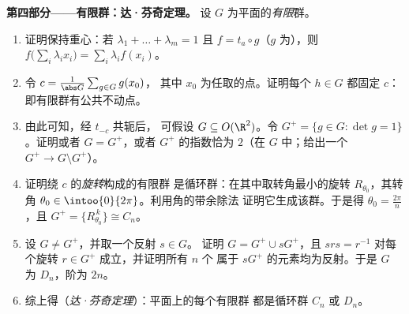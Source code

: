 \begin{problem}
\medskip
\noindent\textbf{第四部分——有限群：达·芬奇定理。}
设 $G$ 为平面的\emph{有限}群。
\begin{enumerate}[resume]
  \item 证明保持重心：若
        $\lambda_1 + \dots + \lambda_m = 1$ 且 $f = t_a \circ
        g$（$g$ 为），则 $f\bigl(\sum_i \lambda_i
        x_i\bigr) = \sum_i \lambda_i f(x_i)$。
  \item 令 $c = \frac{1}{\abs G}\sum_{g \in G} g(x_0)$，
        其中 $x_0$ 为任取的点。证明每个 $h \in G$ 都固定 $c$：
        即有限群有公共不动点。
  \item 由此可知，经 $t_{-c}$ 共轭后，
        可假设 $G \subseteq O(\R^2)$。令 $G^{+} = \{g \in G :
        \det g = 1\}$。证明或者 $G = G^{+}$，或者 $G^{+}$
        的指数恰为 $2$（在 $G$ 中；给出一个 $G^+
        \to G \setminus G^+$）。
  \item 证明绕 $c$ 的\emph{旋转}构成的有限群
        是循环群：在其中取转角最小的旋转
        $R_{\theta_0}$，其转角 $\theta_0 \in
        \intoo{0}{2\pi}$。利用角的带余除法
        证明它生成该群。于是得 $\theta_0 =
        \frac{2\pi}n$，且 $G^{+} = \{R_{\theta_0}^{\,k}\} \cong
        C_n$。
  \item 设 $G \neq G^{+}$，并取一个反射 $s \in G$。
        证明 $G = G^{+} \cup sG^{+}$，且 $s r s = r^{-1}$
        对每个旋转 $r \in G^{+}$ 成立，并证明所有 $n$ 个
        属于 $sG^{+}$ 的元素均为反射。于是 $G$ 为\emph{} $D_n$，阶为 $2n$。
  \item 综上得（\emph{达·芬奇定理}）：平面上的每个有限群
        都是循环群 $C_n$ 或
        $D_n$。
\end{enumerate}


\end{problem}
